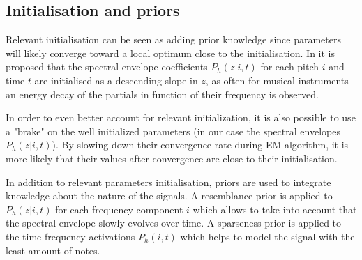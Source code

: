 \documentclass{article}
\begin{document}
\subsection{Initialisation and priors}
\label{sec:init-prior}

Relevant initialisation can be seen as adding prior knowledge since parameters will likely converge toward a local optimum close to the initialisation.
In \cite{Fuentes2013_PhD} it is proposed that the spectral envelope coefficients $P_h(z|i,t)$ for each pitch $i$ and time $t$ are initialised as a descending slope in $z$, as often for musical instruments an energy decay of the partials in function of their frequency is observed.

\vspace{0.1cm}

In order to even better account for relevant initialization, it is also possible to use a "brake" on the well initialized parameters \cite{Fuentes_EUSCIPCO2014} (in our case the spectral envelopes $P_h(z|i,t)$). By slowing down their convergence rate during EM algorithm, it is more likely that their values after convergence are close to their initialisation.  

\vspace{0.1cm}

In addition to relevant parameters initialisation, priors are used to integrate knowledge about the nature of the signals. A resemblance prior \cite{Fuentes2013_PhD} is applied to $P_h(z|i,t)$ for each frequency component $i$ which allows to take into account that the spectral envelope slowly evolves over time. A sparseness prior is applied to the time-frequency activations $P_h(i,t)$ which helps to model the signal with the least amount of notes. 

\end{document}
